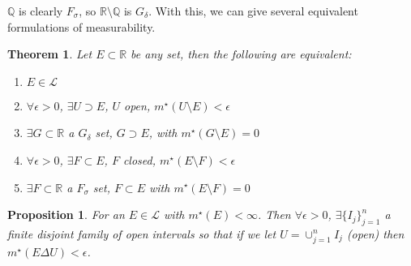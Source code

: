 \documentclass[11pt]{article}
\newtheorem{theorem}{Theorem}[section]
\newtheorem*{prop}{Proposition}
\newcommand{\mstar}[1]{m^{\star}\left(#1\right)}
\newcommand{\gdelta}{G_{\delta}}
\newcommand{\fsigma}{F_{\sigma}}
\begin{document}
   $\mathbb{Q}$ is clearly $\fsigma$, so $\mathbb{R} \setminus \mathbb{Q}$ is $\gdelta$.
    With this, we can give several equivalent formulations of measurability.
    
    \begin{theorem}
        Let $E \subset \mathbb{R}$ be any set, then the following are equivalent:
        \begin{enumerate}
            \item $E \in \mathcal{L}$
            \item $\forall \epsilon > 0$, $\exists U \supset E$, $U$ open, $\mstar{U \setminus E} < \epsilon$
            \item $\exists G \subset \mathbb{R}$ a $\gdelta$ set, $G \supset E$, with $\mstar{G \setminus E} = 0$
            \item $\forall \epsilon > 0$, $\exists F \subset E$, $F$ closed, $\mstar{E \setminus F} < \epsilon$
            \item $\exists F \subset \mathbb{R}$ a $\fsigma$ set, $F \subset E$ with $\mstar{E \setminus F} = 0$
        \end{enumerate}
    \end{theorem}

    \begin{prop}
        For an $E \in \mathcal{L}$ with $\mstar{E} < \infty$.
        Then $\forall \epsilon > 0$, $\exists \{ I_j \}_{j=1}^{n}$ a finite disjoint family of open intervals so that if we let $U = \cup_{j=1}^{n} I_j$ (open) then $\mstar{E \Delta U} < \epsilon$.
    \end{prop}
\end{document}
